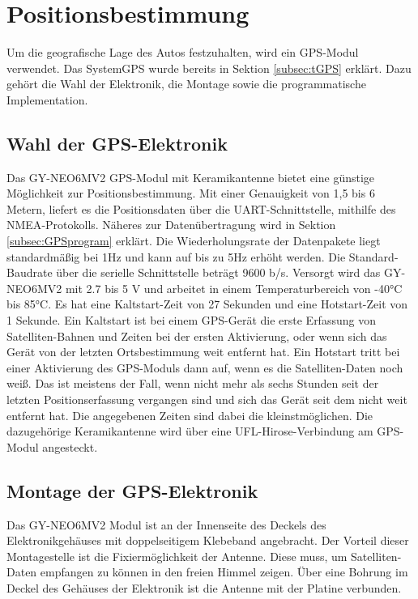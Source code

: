 \section{Positionsbestimmung}
\label{sec:GPS}
Um die geografische Lage des Autos festzuhalten, wird ein \ac{GPS}-Modul verwendet. Das System\ac{GPS} wurde bereits in Sektion \ref{subsec:tGPS} erklärt. Dazu gehört die Wahl der Elektronik, die Montage sowie die programmatische Implementation.

\subsection{Wahl der GPS-Elektronik}
\label{subsec:GPSchoice}
Das GY-NEO6MV2 \ac{GPS}-Modul mit Keramikantenne bietet eine günstige Möglichkeit zur Positionsbestimmung. Mit einer Genauigkeit von 1,5 bis 6 Metern, liefert es die Positionsdaten über die \ac{UART}-Schnittstelle, mithilfe des \ac{NMEA}-Protokolls. Näheres zur Datenübertragung wird in Sektion \ref{subsec:GPSprogram} erklärt. Die Wiederholungsrate der Datenpakete liegt standardmäßig bei 1Hz und kann auf bis zu 5Hz erhöht werden. Die Standard-Baudrate über die serielle Schnittstelle beträgt 9600 b/s. Versorgt wird das GY-NEO6MV2 mit 2.7 bis 5 V und arbeitet in einem Temperaturbereich von -40°C bis 85°C. Es hat eine Kaltstart-Zeit von 27 Sekunden und eine Hotstart-Zeit von 1 Sekunde. Ein Kaltstart ist bei einem GPS-Gerät die erste Erfassung von Satelliten-Bahnen und Zeiten bei der ersten Aktivierung, oder wenn sich das Gerät von der letzten Ortsbestimmung weit entfernt hat. Ein Hotstart tritt bei einer Aktivierung des GPS-Moduls dann auf, wenn es die Satelliten-Daten noch weiß. Das ist meistens der Fall, wenn nicht mehr als sechs Stunden seit der letzten Positionserfassung vergangen sind und sich das Gerät seit dem nicht weit entfernt hat. Die angegebenen Zeiten sind dabei die kleinstmöglichen. Die dazugehörige Keramikantenne wird über eine UFL-Hirose-Verbindung am GPS-Modul angesteckt. 

\subsection{Montage der GPS-Elektronik}
\label{subsec:GPSmount}
Das GY-NEO6MV2 Modul ist an der Innenseite des Deckels des Elektronikgehäuses mit doppelseitigem Klebeband angebracht. Der Vorteil dieser Montagestelle ist die Fixiermöglichkeit der Antenne. Diese muss, um Satelliten-Daten empfangen zu können in den freien Himmel zeigen. Über eine Bohrung im Deckel des Gehäuses der Elektronik ist die Antenne mit der Platine verbunden.


